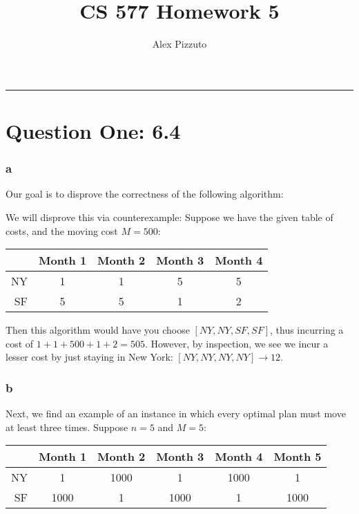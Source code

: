 \documentclass[11pt,letterpaper]{article}
\author{Alex Pizzuto}
\title{CS 577 Homework 5}
\begin{document}
\date{}
\maketitle
\hrule

\section*{Question One: 6.4}
\subsubsection*{a}
Our goal is to disprove the correctness of the following algorithm:

\begin{algorithm}
\end{algorithm}

We will disprove this via counterexample: Suppose we have the given table of costs, and the moving cost $M=500$:

\vspace{5mm}

\renewcommand{\arraystretch}{1.5}
\begin{tabular}{ r |c | c | c| c } \hline
& Month 1 & Month 2 & Month 3 & Month 4 \\ \hline \hline
NY & 1 & 1 & 5 & 5 \\
SF & 5 & 5 & 1 & 2 \\
\end{tabular}
\vspace{5mm}

Then this algorithm would have you choose $[NY, NY, SF, SF]$, thus incurring a cost of $1+1+500+1+2 = 505$. However, by inspection, we see we incur a lesser cost by just staying in New York: $[NY, NY, NY, NY] \rightarrow 12$.

\subsubsection*{b}
Next, we find an example of an instance in which every optimal plan must move at least three times. Suppose $n = 5$ and $M=5$:

\vspace{5mm}

\renewcommand{\arraystretch}{1.5}
\begin{tabular}{ r |c | c | c| c | c } \hline
& Month 1 & Month 2 & Month 3 & Month 4 & Month 5 \\ \hline \hline
NY & 1 & 1000 & 1 & 1000 & 1\\
SF & 1000 & 1 & 1000 & 1 & 1000\\
\end{tabular}
\vspace{5mm}
\end{document}
